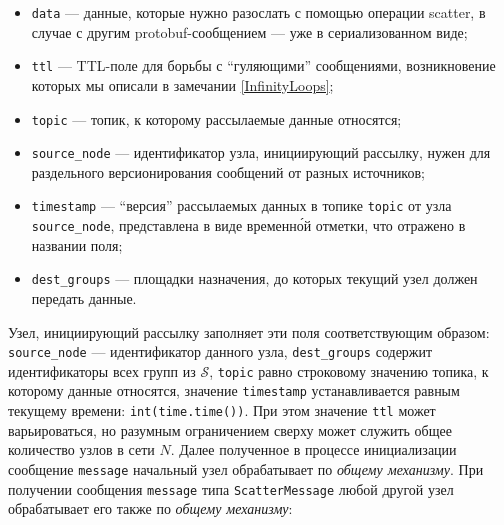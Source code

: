 \documentclass{article}
\theoremstyle{plain}
\theoremstyle{plain}
\theoremstyle{plain}
\theoremstyle{plain}
\theoremstyle{definition}
\theoremstyle{remark}
\theoremstyle{plain}
\begin{document}
\begin{itemize}
    \item \texttt{data} --- данные, которые нужно разослать с помощью операции scatter, в случае с другим protobuf-сообщением --- уже в сериализованном виде;
    
    \item \texttt{ttl} --- TTL-поле для борьбы с \enquote{гуляющими} сообщениями, возникновение которых мы описали в замечании \ref{InfinityLoops};
    
    \item \texttt{topic} --- топик, к которому рассылаемые данные относятся;
    
    \item \texttt{source\_node} --- идентификатор узла, инициирующий рассылку, нужен для раздельного версионирования сообщений от разных источников;
    
    \item \texttt{timestamp} --- \enquote{версия} рассылаемых данных в топике \texttt{topic} от узла \texttt{source\_node}, представлена в виде временн\'{о}й отметки, что отражено в названии поля;
    
    \item \texttt{dest\_groups} --- площадки назначения, до которых текущий узел должен передать данные.
\end{itemize}

Узел, инициирующий рассылку заполняет эти поля соответствующим образом: \\
\texttt{source\_node} --- идентификатор данного узла, \texttt{dest\_groups} содержит идентификаторы всех групп из $\mathcal{S}$, \texttt{topic} равно строковому значению топика, к которому данные относятся, значение \texttt{timestamp} устанавливается равным текущему времени: \texttt{int(time.time())}. При этом значение \texttt{ttl} может варьироваться, но разумным ограничением сверху может служить общее количество узлов в сети $N$. Далее полученное в процессе инициализации сообщение \texttt{message} начальный узел обрабатывает по \textit{общему механизму}. При получении сообщения \texttt{message} типа \texttt{ScatterMessage} любой другой узел обрабатывает его также по \textit{общему механизму}:
\end{document}
